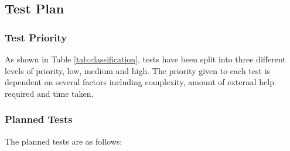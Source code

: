 \pagebreak
\subsection{Test Plan}

\subsubsection{Test Priority} \label{sec:5.2.1-testpriority}
As shown in Table \ref{tab:classification}, tests have been split into three different levels of priority, low, medium and high. The priority given to each test is dependent on several factors including complexity, amount of external help required and time taken. 



\subsubsection{Planned Tests}
The planned tests are as follows:

